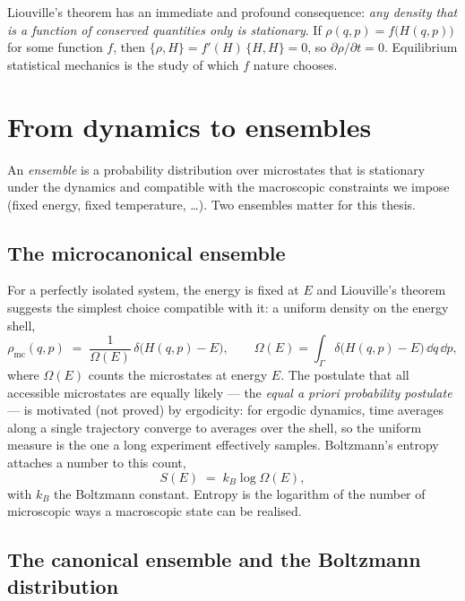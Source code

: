 Liouville's theorem has an immediate and profound consequence: \emph{any
density that is a function of conserved quantities only is stationary}. If
$\rho(q,p) = f\big(H(q,p)\big)$ for some function $f$, then
$\{\rho, H\} = f'(H)\,\{H, H\} = 0$, so $\partial \rho / \partial t = 0$.
Equilibrium statistical mechanics is the study of which $f$ nature chooses.

\section{From dynamics to ensembles}\label{sec:ensembles}

An \emph{ensemble} is a probability distribution over microstates that is
stationary under the dynamics and compatible with the macroscopic constraints
we impose (fixed energy, fixed temperature, \dots). Two ensembles matter for
this thesis.

\subsection{The microcanonical ensemble}

For a perfectly isolated system, the energy is fixed at $E$ and Liouville's
theorem suggests the simplest choice compatible with it: a uniform density on
the energy shell,
\begin{equation}
  \rho_{\mathrm{mc}}(q, p)
  \;=\; \frac{1}{\Omega(E)}\,
        \delta\big(H(q,p) - E\big),
  \qquad
  \Omega(E) = \int_\Gamma \delta\big(H(q,p) - E\big)\,\dd q\,\dd p ,
  \label{eq:microcanonical}
\end{equation}
where $\Omega(E)$ counts the microstates at energy $E$. The postulate that
all accessible microstates are equally likely --- the \emph{equal a priori
probability postulate} --- is motivated (not proved) by ergodicity: for
ergodic dynamics, time averages along a single trajectory converge to
averages over the shell, so the uniform measure is the one a long experiment
effectively samples. Boltzmann's entropy attaches a number to this count,
\begin{equation}
  S(E) \;=\; k_B \log \Omega(E),
  \label{eq:boltzmann-entropy}
\end{equation}
with $k_B$ the Boltzmann constant. Entropy is the logarithm of the number of
microscopic ways a macroscopic state can be realised.

\subsection{The canonical ensemble and the Boltzmann distribution}
\label{sec:canonical}

